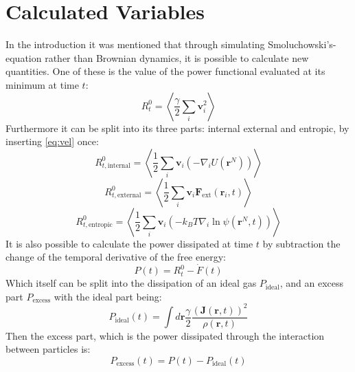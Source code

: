 \documentclass[a4paper]{article}
\renewcommand\vec[1]{\mathbf{#1}}
\begin{document}
\section{Calculated Variables}
In the introduction it was mentioned that through simulating Smoluchowski's-equation rather than Brownian dynamics, it is possible to calculate new quantities. One of these is the value of the power functional evaluated at its minimum at time $t$:
\begin{equation}
	R^0_t=\left\langle \frac{\gamma}{2} \sum_i \vec{v}_i^2 \right\rangle
	\label{eq:powerfunctional}
\end{equation}
Furthermore it can be split into its three parts: internal external and entropic, by inserting \cref{eq:vel} once:
\begin{equation}
	R^0_{t,\text{internal}}=\left\langle \frac{1}{2} \sum_i \vec{v}_i \left( - \nabla_i U\left( \vec{r}^N \right)  \right) \right\rangle
	\label{eq:powerint}
\end{equation}
\begin{equation}
	R^0_{t,\text{external}}=\left\langle \frac{1}{2} \sum_i \vec{v}_i  \vec{F}_\text{ext} \left( \vec{r}_i ,t \right)  \right\rangle
	\label{eq:powerext}
\end{equation}
\begin{equation}
	R^0_{t,\text{entropic}}=\left\langle \frac{1}{2} \sum_i \vec{v}_i \left(  - k_B T \nabla_i \ln \psi \left( \vec{r}^N ,t \right) \right) \right\rangle
	\label{eq:powerent}
\end{equation}
It is also possible to calculate the power dissipated at time $t$ by subtraction the change of the temporal derivative of the free energy:
\begin{equation}
	P(t)=R^0_t-\dot{F}(t)
	\label{eq:dissipation}
\end{equation}
Which itself can be split into the dissipation of an ideal gas $P_\text{ideal}$, and an excess part $P_\text{excess}$ with the ideal part being:
\begin{equation}
	P_\text{ideal}(t)=\int d \vec{r} \frac{ \gamma}{2} \frac{\left( \vec{J}\left( \vec{r}, t \right) \right)^2}{ \rho\left( \vec{r}, t \right)} 
	\label{eq:dissipationideal}
\end{equation}
Then the excess part, which is the power dissipated through the interaction between particles is:
\begin{equation}
	P_\text{excess}(t)=P(t)- P_\text{ideal}(t) 
	\label{eq:dissipationexess}
\end{equation}
\end{document}
